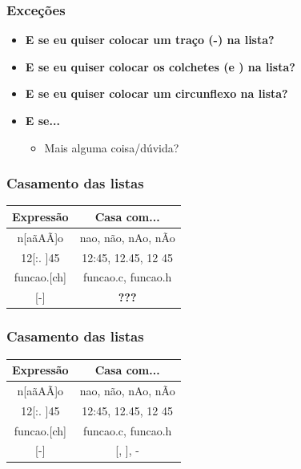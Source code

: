 \begin{frame}
	\frametitle{Exceções}
	
	\begin{itemize}
		\item \textbf{E se eu quiser colocar um traço (-) na lista?}
		\item \textbf{E se eu quiser colocar os colchetes (\lcol  e \rcol) na lista?}
		\item \textbf{E se eu quiser colocar um circunflexo na lista?}
		\item \textbf{E se...}
		\begin{itemize}
			\item Mais alguma coisa/dúvida?
		\end{itemize}
	\end{itemize}

\end{frame}

\begin{frame}
	\frametitle{Casamento das listas}
	\begin{center}
	\begin{tabular}{ c | c }
		\textbf{Expressão} & \textbf{Casa com...} \\ \hline
		n[aãAÃ]o	&	nao, não, nAo, nÃo \\ \hline
		12[:. ]45	&	12:45, 12.45, 12 45 \\ \hline
		funcao.[ch]	&	funcao.c, funcao.h   \\ \hline
		[][-]		&	\textbf{???}		\\ \hline

	\end{tabular}
	\end{center}
\end{frame}

\begin{frame}
	\frametitle{Casamento das listas}
	\begin{center}
	\begin{tabular}{ c | c }
		\textbf{Expressão} & \textbf{Casa com...} \\ \hline
		n[aãAÃ]o	&	nao, não, nAo, nÃo \\ \hline
		12[:. ]45	&	12:45, 12.45, 12 45 \\ \hline
		funcao.[ch]	&	funcao.c, funcao.h   \\ \hline
		[][-]		&	[, ], -		\\ \hline
	\end{tabular}
	\end{center}
\end{frame}


